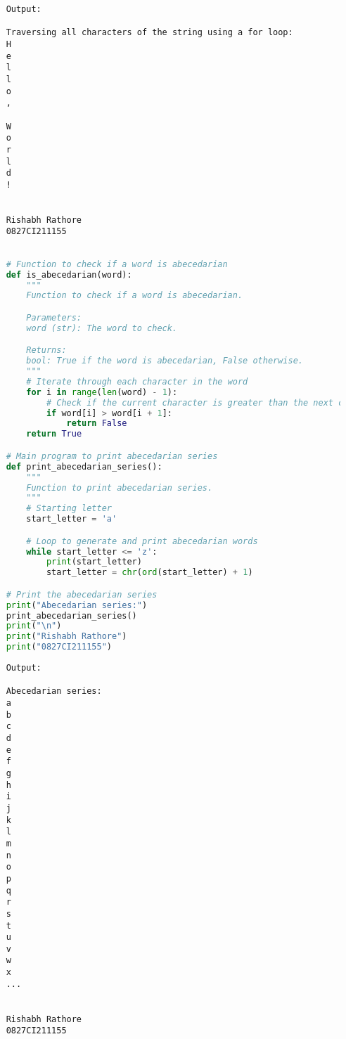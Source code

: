 \documentclass{report}
\begin{document}
\begin{verbatim}
	Output:

	Traversing all characters of the string using a for loop:
	H
	e
	l
	l
	o
	,
	 
	W
	o
	r
	l
	d
	!
	
	
	Rishabh Rathore
	0827CI211155
\end{verbatim}
\newpage


\sol{}
\begin{lstlisting}[language=Python]

	# Function to check if a word is abecedarian
	def is_abecedarian(word):
		"""
		Function to check if a word is abecedarian.

		Parameters:
		word (str): The word to check.

		Returns:
		bool: True if the word is abecedarian, False otherwise.
		"""
		# Iterate through each character in the word
		for i in range(len(word) - 1):
			# Check if the current character is greater than the next character
			if word[i] > word[i + 1]:
				return False
		return True

	# Main program to print abecedarian series
	def print_abecedarian_series():
		"""
		Function to print abecedarian series.
		"""
		# Starting letter
		start_letter = 'a'

		# Loop to generate and print abecedarian words
		while start_letter <= 'z':
			print(start_letter)
			start_letter = chr(ord(start_letter) + 1)

	# Print the abecedarian series
	print("Abecedarian series:")
	print_abecedarian_series()
	print("\n")
	print("Rishabh Rathore")
	print("0827CI211155")
\end{lstlisting}

\begin{verbatim}
	Output:

	Abecedarian series:
	a
	b
	c
	d
	e
	f
	g
	h
	i
	j
	k
	l
	m
	n
	o
	p
	q
	r
	s
	t
	u
	v
	w
	x
	...
	
	
	Rishabh Rathore
	0827CI211155
\end{verbatim}
\newpage
\end{document}
